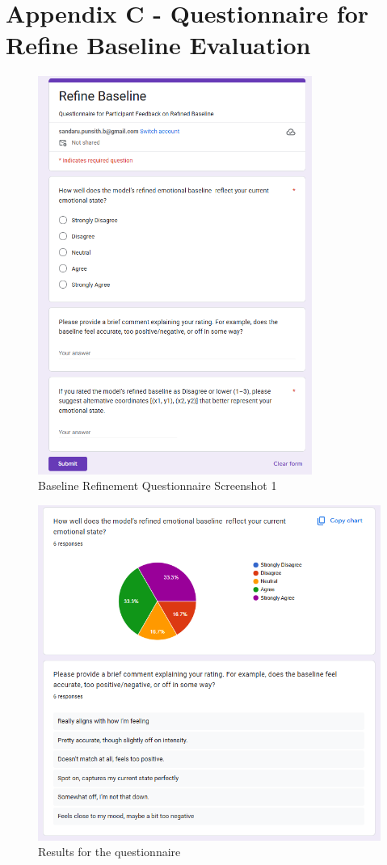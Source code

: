\section*{Appendix C - Questionnaire for Refine Baseline Evaluation}
\label{sec:appendix-refine-questionnaire}

\begin{figure}[H]
    \centering
    \includegraphics[width=0.8\textwidth]{appendix/imgs/refine-questions.png}
    \caption{Baseline Refinement Questionnaire Screenshot 1}
\end{figure}

\begin{figure}[H]
    \centering
    \includegraphics[width=1.1\textwidth]{appendix/imgs/refine-results.png}
    \caption{Results for the questionnaire}
\end{figure}




